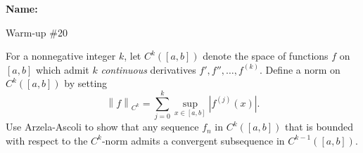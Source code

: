 \documentclass[12pt]{article}
\newcommand{\norm}[1]{\left\lVert#1\right\rVert}
\begin{document}
\noindent \textbf{Name:} 

\begin{center}
Warm-up \#20
\end{center}

\noindent For a nonnegative integer $k$, let $C^k([a,b])$ denote the space of functions $f$ on $[a,b]$ which admit $k$ \emph{continuous} derivatives $f', f'', \ldots, f^{(k)}$. Define a norm on $C^k([a,b])$ by setting 
\[
\norm{f}_{C^k} = \sum_{j=0}^k \sup_{x \in [a,b]}|f^{(j)}(x)|.
\]
Use Arzela-Ascoli to show that any sequence $f_n$ in $C^k([a,b])$ that is bounded with respect to the $C^k$-norm admits a convergent subsequence in $C^{k-1}([a,b])$.  
\end{document}
